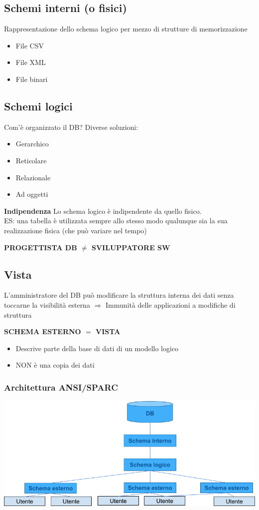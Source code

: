 \documentclass[12pt,a4paper]{article}
\begin{document}
\subsection{Schemi interni (o fisici)}
Rappresentazione dello schema logico per mezzo di strutture di memorizzazione
\begin{itemize}
\item File CSV
\item File XML
\item File binari
\end{itemize}

\subsection{Schemi logici}
Com'è organizzato il DB? Diverse soluzioni:
\begin{itemize}
\item Gerarchico
\item Reticolare
\item Relazionale
\item Ad oggetti
\end{itemize}
\textbf{Indipendenza}
Lo schema logico è indipendente da quello fisico.\\
ES: una tabella è utilizzata sempre allo stesso modo qualunque sia la sua realizzazione fisica (che può variare nel tempo)
\begin{center}\textbf{PROGETTISTA DB $\not =$ SVILUPPATORE SW}\end{center}

\subsection{Vista}
L'amministratore del DB può modificare la struttura interna dei dati senza toccarne la visibilità esterna $\Longrightarrow$ Immunità delle applicazioni a modifiche di struttura
\begin{center}\textbf{SCHEMA ESTERNO $=$ VISTA}\end{center}
\begin{itemize}
\item Descrive parte della base di dati di un modello logico
\item NON è una copia dei dati
\end{itemize}

\subsubsection{Architettura ANSI/SPARC}
\begin{center}
\includegraphics[width=0.6\columnwidth]{img/ansisparc.png}
\end{center}
\end{document}
